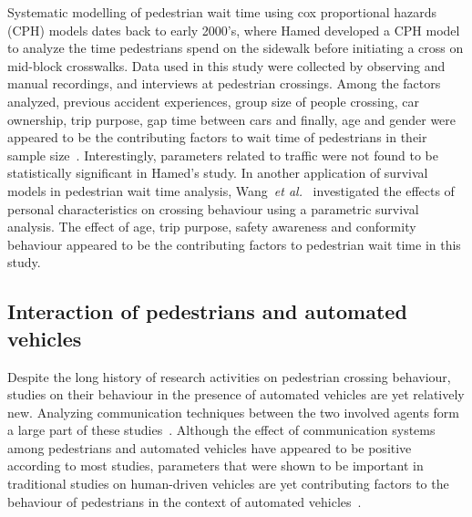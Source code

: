 Systematic modelling of pedestrian wait time using cox proportional hazards (CPH) models dates back to early 2000's, where Hamed developed a CPH model to analyze the time pedestrians spend on the sidewalk before initiating a cross on mid-block crosswalks. Data used in this study were collected by observing and manual recordings, and interviews at pedestrian crossings. Among the factors analyzed, previous accident experiences, group size of people crossing, car ownership, trip purpose, gap time between cars and finally, age and gender were appeared to be the contributing factors to wait time of pedestrians in their sample size~\cite{hamed2001analysis}. Interestingly, parameters related to traffic were not found to be statistically significant in Hamed's study. In another application of survival models in pedestrian wait time analysis, Wang~\textit{et al.}~\cite{wang2011individual} investigated the effects of personal characteristics on crossing behaviour using a parametric survival analysis. The effect of age, trip purpose, safety awareness and conformity behaviour appeared to be the contributing factors to pedestrian wait time in this study. 

\subsection{Interaction of pedestrians and automated vehicles}
Despite the long history of research activities on pedestrian crossing behaviour, studies on their behaviour in the presence of automated vehicles are yet relatively new. Analyzing communication techniques between the two involved agents form a large part of these studies~\citep{millard2018pedestrians,clamann2017evaluation,rasouli2017agreeing,mahadevan2018communicating}. Although the effect of communication systems among pedestrians and automated vehicles have appeared to be positive according to most studies, parameters that were shown to be important in traditional studies on human-driven vehicles are yet contributing factors to the behaviour of pedestrians in the context of automated vehicles~\citep{pillai2017virtual,clamann2017evaluation}.

